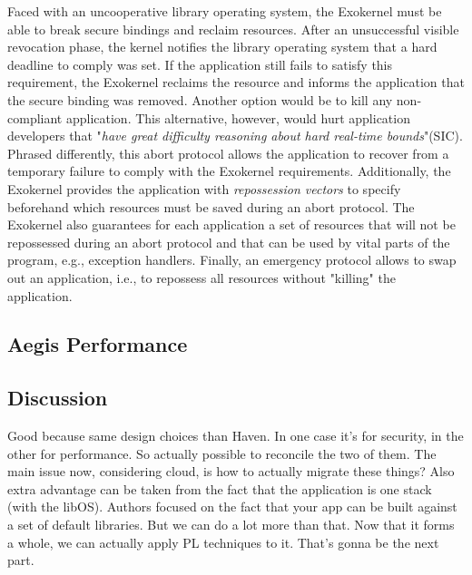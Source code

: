 Faced with an uncooperative library operating system, the Exokernel must be able to break secure bindings and reclaim resources.
After an unsuccessful visible revocation phase, the kernel notifies the library operating system that a hard deadline to comply was set.
If the application still fails to satisfy this requirement, the Exokernel reclaims the resource and informs the application that the secure binding was removed.
Another option would be to kill any non-compliant application.
This alternative, however, would hurt application developers that "\textit{have great difficulty reasoning about hard real-time bounds}"(SIC).
Phrased differently, this abort protocol allows the application to recover from a temporary failure to comply with the Exokernel requirements.
Additionally, the Exokernel provides the application with \emph{repossession vectors} to specify beforehand which resources must be saved during an abort protocol.
The Exokernel also guarantees for each application a set of resources that will not be repossessed during an abort protocol and that can be used by vital parts of the program, e.g., exception handlers.
Finally, an emergency protocol allows to swap out an application, i.e., to repossess all resources without "killing" the application.

\subsection{Aegis Performance}



\subsection{Discussion}
Good because same design choices than Haven.
In one case it's for security, in the other for performance.
So actually possible to reconcile the two of them.
The main issue now, considering cloud, is how to actually migrate these things?
Also extra advantage can be taken from the fact that the application is one stack (with the libOS).
Authors focused on the fact that your app can be built against a set of default libraries.
But we can do a lot more than that. Now that it forms a whole, we can actually apply PL techniques to it.
That's gonna be the next part.



